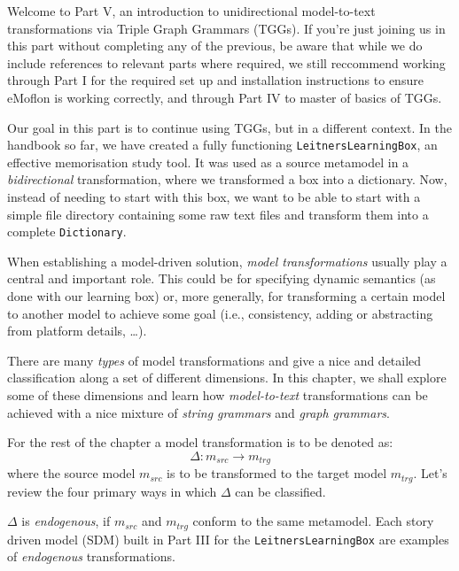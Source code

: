 \genHeader

Welcome to Part V, an introduction to unidirectional model-to-text transformations via Triple Graph Grammars (TGGs). If you're just joining us in this part
without completing any of the previous, be aware that while we do include references to relevant parts where required, we still reccommend working through Part
I for the required set up and installation instructions to ensure eMoflon is working correctly, and through Part IV to master of basics of TGGs. 

Our goal in this part is to continue using TGGs, but in a different context. In the handbook so far, we have created a fully functioning
\texttt{LeitnersLearningBox}, an effective memorisation study tool. It was used as a source metamodel in a \emph{bidirectional} transformation, where we
transformed a box into a dictionary. Now, instead of needing to start with this box, we want to be able to start with a simple file directory
containing some raw text files and transform them into a complete \texttt{Dictionary}.

When establishing a model-driven solution, \emph{model transformations} usually play a central and important role. This could be
for specifying dynamic semantics (as done with our learning box) or, more generally, for transforming a certain model to another model to achieve some goal
(i.e., consistency, adding or abstracting from platform details, \ldots).

There are many \emph{types} of model transformations and \cite{CH03,Mens_Gorp_2006} give a nice and detailed classification along a set of different
dimensions. In this chapter, we shall explore some of these dimensions and learn how \emph{model-to-text}
transformations can be achieved with a nice mixture of \emph{string grammars} and \emph{graph grammars}.

For the rest of the chapter a model transformation is to be denoted as:
\begin{displaymath}
 	\Delta: m_{src} \rightarrow m_{trg}
\end{displaymath}
where the source model $m_{src}$ is to be transformed to the target model $m_{trg}$. Let's review the four primary ways in which $\Delta$ can be classified.

$\Delta$ is \emph{endogenous}, if $m_{src}$ and $m_{trg}$ conform to the same metamodel. Each story driven model (SDM) built in Part III for
the \texttt{LeitnersLearningBox} are examples of \emph{endogenous} transformations.

